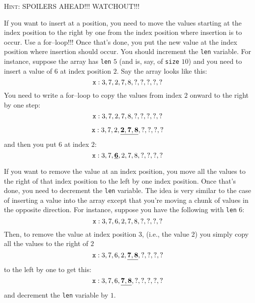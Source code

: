 \newpage
\textsc{Hint: SPOILERS AHEAD!!! WATCHOUT!!!}

\begin{itemize}
  \li If you want to insert at a position, you need to move the values
      starting at the index position to the right by one from the index
      position where insertion is to occur. Use a for--loop!!! Once that's
      done, you put the new value at the index position where insertion
      should occur. You should increment the \verb!len! variable. For instance,
      suppose the array has \verb!len! $5$ (and is, say, of \verb!size! $10$)
      and you need to insert a value of $6$ at index position $2$. Say the
      array looks like this:
      \[\verb!x!: 3, 7, 2, 7, 8, ?, ?, ?, ?, ?\]
      You need to write a for--loop to copy the values from index $2$ onward
      to the right by one step:
      \[\verb!x!: 3, 7, 2, 7, 8, ?, ?, ?, ?, ?\]
      \begin{center}
      \end{center}
      \[\verb!x!: 3, 7, 2, \underline{\mathbf{2, 7, 8}}, ?, ?, ?, ?\]
and then you put $6$ at index $2$:
      \[\verb!x!: 3, 7, \underline{\mathbf{6}}, 2, 7, 8, ?, ?, ?, ?\]

  \li If you want to remove the value at an index position, you move all the
      values to the right of that index position to the left by one index
      position. Once that's done, you need to decrement the \verb!len!
      variable. The idea is very similar to the case of inserting a value
      into the array except that you're moving a chunk of values in the
      opposite direction. For instance, suppose you have the following with
      \verb!len! $6$:
      \[\verb!x!: 3, 7, 6, 2, 7, 8, ?, ?, ?, ?\]
      Then, to remove the value at index position $3$, (i.e., the value $2$)
      you simply copy all the values to the right of $2$
      \[\verb!x!: 3, 7, 6, 2, \underline{\mathbf{7, 8}}, ?, ?, ?, ?\]
      to the left by one to get this:
      \[\verb!x!: 3, 7, 6, \underline{\mathbf{7, 8}}, ?, ?, ?, ?, ?\]
      and decrement the \verb!len! variable by $1$.
\end{itemize}

